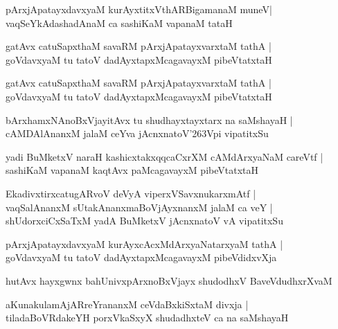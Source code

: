 \begin{shloka}
pArxjApatayxdavxyaM kurAyxtitxVthARBigamanaM muneV|\\
vaqSeYkAdashadAnaM ca sashiKaM vapanaM tataH
\end{shloka}

\begin{shloka}
gatAvx catuSapxthaM savaRM pArxjApatayxvarxtaM tathA |\\
goVdavxyaM tu tatoV dadAyxtapxMcagavayxM pibeVtatxtaH
\end{shloka}

\begin{shloka}
gatAvx catuSapxthaM savaRM pArxjApatayxvarxtaM tathA |\\
goVdavxyaM tu tatoV dadAyxtapxMcagavayxM pibeVtatxtaH
\end{shloka}

\begin{shloka}
bArxhamxNAnoBxVjayitAvx tu shudhayxtayxtarx na saMshayaH |\\
cAMDAlAnanxM jalaM ceYva jAcnxnatoV\char'263Vpi vipatitxSu
\end{shloka}

\begin{shloka}
yadi BuMketxV naraH kashicxtakxqqcaCxrXM cAMdArxyaNaM careVtf |\\
sashiKaM vapanaM kaqtAvx paMcagavayxM pibeVtatxtaH
\end{shloka}

\begin{shloka}
EkadivxtirxcatugARvoV deVyA viperxVSavxnukarxmAtf |\\
vaqSalAnanxM sUtakAnanxmaBoVjAyxnanxM jalaM ca veY |\\
shUdorxciCxSaTxM yadA BuMketxV jAcnxnatoV vA vipatitxSu
\end{shloka}

\begin{shloka}
pArxjApatayxdavxyaM kurAyxcAcxMdArxyaNatarxyaM tathA |\\
goVdavxyaM tu tatoV dadAyxtapxMcagavayxM pibeVdidxvXja
\end{shloka}

\begin{shloka}
hutAvx hayxgwnx bahUnivxpArxnoBxVjayx shudodhxV BaveVdudhxrXvaM
\end{shloka}

\begin{shloka}
aKunakulamAjARreYrananxM ceVdaBxkiSxtaM divxja |\\
tiladaBoVRdakeYH porxVkaSxyX shudadhxteV ca na saMshayaH 
\end{shloka}

